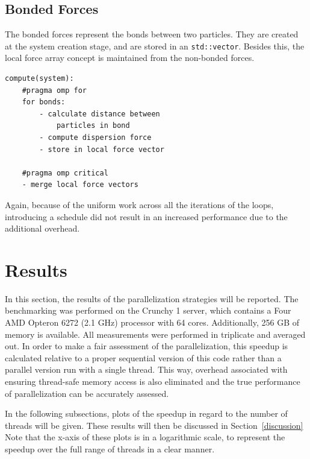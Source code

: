 \documentclass[conference]{IEEEtran}
\begin{document}
\subsection{Bonded Forces}
The bonded forces represent the bonds between two particles. They are created at the system creation stage, and are
stored in an \texttt{std::vector}. Besides this, the local force array concept is maintained from the non-bonded
forces.
\begin{lstlisting}
compute(system):
    #pragma omp for
    for bonds:
        - calculate distance between 
            particles in bond
        - compute dispersion force
        - store in local force vector

    #pragma omp critical
    - merge local force vectors
\end{lstlisting}
Again, because of the uniform work across all the iterations of the loops, introducing a schedule did not result in
an increased performance due to the additional overhead.

\section{Results}\label{res}
In this section, the results of the parallelization strategies will be reported. The benchmarking was performed on the
Crunchy 1 server, which contains a Four AMD Opteron 6272 (2.1 GHz) processor with 64 cores. Additionally, 256 GB of
memory is available. All measurements were performed in triplicate and averaged out. In order to 
make a fair assessment of the parallelization, this speedup is calculated relative to a proper sequential version
of this code rather than a parallel version run with a single thread. This way, overhead associated with ensuring
thread-safe memory access is also eliminated and the true performance of parallelization can be accurately assessed.

In the following subsections, plots of the speedup in regard to the number of threads will be given. These results
will then be discussed in Section~\ref{discussion}
Note that the x-axis of these plots is in a logarithmic scale, to represent the speedup over the full
range of threads in a clear manner.
\end{document}
